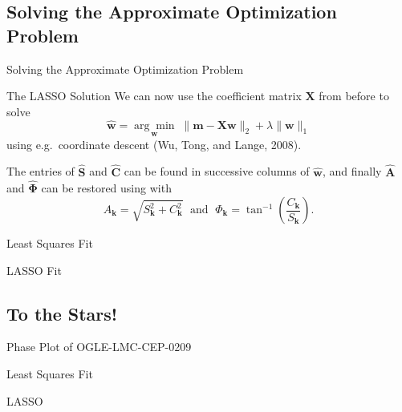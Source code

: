 \documentclass{beamer}
\begin{document}
\subsection{Solving the Approximate Optimization Problem}
\begin{frame}{Solving the Approximate Optimization Problem}
\begin{block}{The LASSO Solution}
We can now use the coefficient matrix $\mathbf X$ from before to solve
$$\mathbf{\hat w} = \underset{\mathbf w}{\arg\min} \; \| \mathbf {m} - \mathbf {X} \mathbf {w} \|_2 + \lambda \| \mathbf{w} \|_1$$
using e.g.~coordinate descent (Wu, Tong, and Lange, 2008).
\end{block}
\vspace{5mm}
The entries of $\mathbf{\hat S}$ and $\mathbf{\hat C}$ can be found in successive columns of $\mathbf{\hat{w}}$, and finally $\mathbf{\hat A}$ and $\boldsymbol{\hat{\Phi}}$ can be restored using with
$$A_{\mathbf{k}} = \sqrt{S_{\mathbf{k}}^2 + C_{\mathbf{k}}^2} \; \text{ and } \; \Phi_{\mathbf{k}} = \tan^{-1} \left(\frac{C_{\mathbf{k}}}{S_{\mathbf{k}}}\right).$$
\end{frame}

\begin{frame}{Least Squares Fit}
\begin{figure}
\centering

\end{figure} 
\end{frame}

\begin{frame}{LASSO Fit}
\begin{figure}
\centering

\end{figure} 
\end{frame}

\subsection{To the Stars!}

\begin{frame}{Phase Plot of OGLE-LMC-CEP-0209}
\makebox[\textwidth][c]{}
\end{frame}

\begin{frame}{Least Squares Fit}
\makebox[\textwidth][c]{}
\end{frame}

\begin{frame}{LASSO}
\makebox[\textwidth][c]{}
\end{frame}
\end{document}
